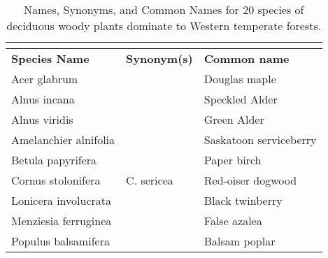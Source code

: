 \documentclass[12pt, letterpaper]{article}
\begin{document}
\setlength\LTcapwidth{\textwidth} 
\setlength\LTleft{0pt}            
\setlength\LTright{0pt}%
\begingroup\footnotesize
\begin{longtable}{p{}|p{}|p{}}
\caption{Names, Synonyms, and Common Names for 20 species of deciduous woody plants dominate to Western temperate forests. } \\ 
\label{tabSp}\\
  \hline
\textbf{Species Name} & \textbf{Synonym(s)} & \textbf{Common name} \\
  \hline
 \hline
  Acer glabrum & & Douglas maple \\
  Alnus incana & & Speckled Alder \\
  Alnus viridis & & Green Alder \\
  Amelanchier alnifolia & & Saskatoon serviceberry \\
  Betula papyrifera & & Paper birch \\
  Cornus stolonifera & C. sericea & Red-oiser dogwood \\
  Lonicera involucrata & & Black twinberry \\
  Menziesia ferruginea & & False azalea \\
  Populus balsamifera & & Balsam poplar \\

\end{longtable}
\end{document}
